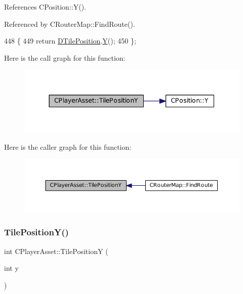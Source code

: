 References C\+Position\+::\+Y().



Referenced by C\+Router\+Map\+::\+Find\+Route().


\begin{DoxyCode}
448                                  \{
449             \textcolor{keywordflow}{return} \hyperlink{classCPlayerAsset_a5b59a9d3b7db8c7fa194b80dafb96186}{DTilePosition}.\hyperlink{classCPosition_a1aa8a30e2f08dda1f797736ba8c13a87}{Y}();  
450         \};
\end{DoxyCode}
Here is the call graph for this function\+:\nopagebreak
\begin{figure}[H]
\begin{center}
\leavevmode
\includegraphics[width=344pt]{classCPlayerAsset_a189adb25bf0a45117a9c0bb36b45e6a4_cgraph}
\end{center}
\end{figure}
Here is the caller graph for this function\+:\nopagebreak
\begin{figure}[H]
\begin{center}
\leavevmode
\includegraphics[width=350pt]{classCPlayerAsset_a189adb25bf0a45117a9c0bb36b45e6a4_icgraph}
\end{center}
\end{figure}
\hypertarget{classCPlayerAsset_ad3ce562cbd27e2c35abe968a7ff19cd6}{}\label{classCPlayerAsset_ad3ce562cbd27e2c35abe968a7ff19cd6} 
\subsubsection{\texorpdfstring{Tile\+Position\+Y()}{TilePositionY()}\hspace{0.1cm}{\footnotesize\ttfamily [2/2]}}
{\footnotesize\ttfamily int C\+Player\+Asset\+::\+Tile\+PositionY (\begin{DoxyParamCaption}\item[{int}]{y }\end{DoxyParamCaption})}



